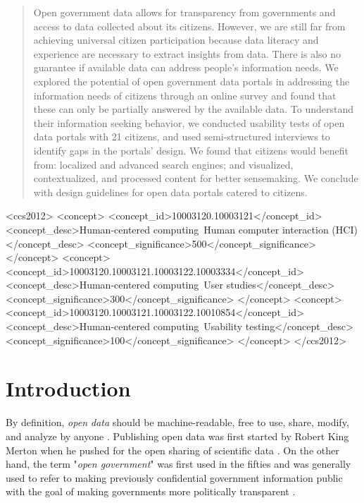 \documentclass{sigchi}
\def\plainkeywords{Open data, information seeking, user study}
\begin{document}
\begin{abstract}
Open government data allows for transparency from governments and access to data collected about its citizens. However, we are still far from achieving universal citizen participation because data literacy and experience are necessary to extract insights from data. There is also no guarantee if available data can address people's information needs. We explored the potential of open government data portals in addressing the information needs of citizens through an online survey and found that these can only be partially answered by the available data. To understand their information seeking behavior, we conducted usability tests of open data portals with 21 citizens, and used semi-structured interviews to identify gaps in the portals' design. We found that citizens would benefit from: localized and advanced search engines; and visualized, contextualized, and processed content for better sensemaking. We conclude with design guidelines for open data portals catered to citizens.
\end{abstract}



\begin{CCSXML}
<ccs2012>
<concept>
<concept_id>10003120.10003121</concept_id>
<concept_desc>Human-centered computing~Human computer interaction (HCI)</concept_desc>
<concept_significance>500</concept_significance>
</concept>
<concept>
<concept_id>10003120.10003121.10003122.10003334</concept_id>
<concept_desc>Human-centered computing~User studies</concept_desc>
<concept_significance>300</concept_significance>
</concept>
<concept>
<concept_id>10003120.10003121.10003122.10010854</concept_id>
<concept_desc>Human-centered computing~Usability testing</concept_desc>
<concept_significance>100</concept_significance>
</concept>
</ccs2012>
\end{CCSXML}


\keywords{\plainkeywords}

\printccsdesc

\section{Introduction}
By definition, \textit{open data} should be machine-readable, free to use, share, modify, and analyze by anyone \cite{corrales2019knowledge, DAWES201615}. Publishing open data was first started by Robert King Merton when he pushed for the open sharing of scientific data \cite{chignard2013}. On the other hand, the term "\textit{open government}" was first used in the fifties and was generally used to refer to making previously confidential government information public with the goal of making governments more politically transparent \cite{YuRobinson2012}. 
\end{document}
